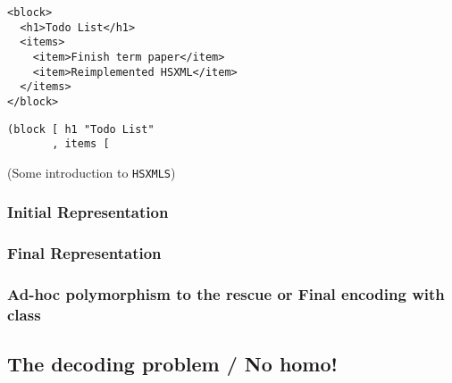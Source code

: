 \documentclass[11pt]{article}
\begin{document}
\begin{verbatim}
<block>
  <h1>Todo List</h1>
  <items>
    <item>Finish term paper</item>
    <item>Reimplemented HSXML</item>
  </items>
</block>
\end{verbatim}

\begin{verbatim}
(block [ h1 "Todo List"
       , items [

\end{verbatim}

(Some introduction to \texttt{HSXMLS})

\subsubsection{Initial Representation}
\label{sec:orgb887e78}
\subsubsection{Final Representation}
\label{sec:org3064bcc}
\subsubsection{Ad-hoc polymorphism to the rescue \textbf{or} Final encoding with class}
\label{sec:org6b2b1a6}

\subsection{The decoding problem / No homo!}
\label{sec:org357de43}
\end{document}
